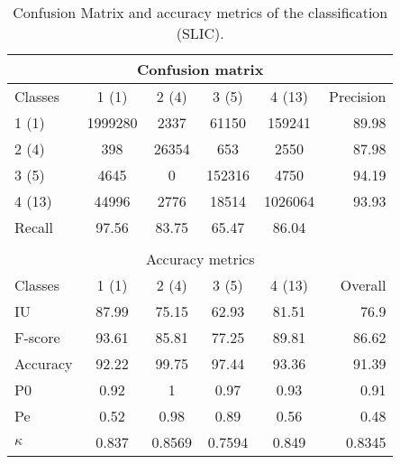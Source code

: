 \begin{table}[H]
\begin{center}
\footnotesize
\begin{tabular}{|l|c|c|c|c|r|}
\hline
\multicolumn{6}{|c|}{Confusion matrix} \\
\hline
 Classes & 1 (1) & 2 (4) & 3 (5) & 4 (13) & Precision \\
\hline
1 (1) & 1999280 & 2337 & 61150 & 159241 & 89.98 \\
\hline
2 (4) & 398 & 26354 & 653 & 2550 & 87.98 \\
\hline
3 (5) & 4645 & 0 & 152316 & 4750 & 94.19 \\
\hline
4 (13) & 44996 & 2776 & 18514 & 1026064 & 93.93 \\
\hline
Recall & 97.56 & 83.75 & 65.47 & 86.04 &  \\
\hline
\multicolumn{6}{c}{ } \\
\hline
\multicolumn{6}{|c|}{Accuracy metrics} \\
\hline
 Classes & 1 (1) & 2 (4) & 3 (5) & 4 (13) & Overall \\
\hline
IU & 87.99 & 75.15 & 62.93 & 81.51 & 76.9 \\
\hline
F-score & 93.61 & 85.81 & 77.25 & 89.81 & 86.62 \\
\hline
Accuracy & 92.22 & 99.75 & 97.44 & 93.36 & 91.39 \\
\hline
P0 & 0.92 & 1 & 0.97 & 0.93 & 0.91 \\
\hline
Pe & 0.52 & 0.98 & 0.89 & 0.56 & 0.48 \\
\hline
$\kappa$ & 0.837 & 0.8569 & 0.7594 & 0.849 & 0.8345 \\
\hline
\end{tabular}
\caption{Confusion Matrix and accuracy metrics of the classification (SLIC).}
\label{table:}
\end{center}
\end{table}

